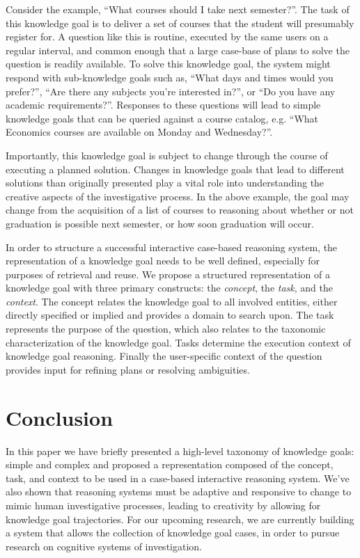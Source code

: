 \documentclass[11pt,letterpaper]{article}
\begin{document}
Consider the example, “What courses should I take next semester?”. The task of this knowledge goal is to deliver a set of courses that the student will presumably register for. A question like this is routine, executed by the same users on a regular interval, and common enough that a large case-base of plans to solve the question is readily available. To solve this knowledge goal, the system might respond with sub-knowledge goals such as, “What days and times would you prefer?”, “Are there any subjects you're interested in?”, or “Do you have any academic requirements?”. Responses to these questions will lead to simple knowledge goals that can be queried against a course catalog, e.g. “What Economics courses are available on Monday and Wednesday?”.

Importantly, this knowledge goal is subject to change through the course of executing a planned solution. Changes in knowledge goals that lead to different solutions than originally presented play a vital role into understanding the creative aspects of the investigative process. In the above example, the goal may change from the acquisition of a list of courses to reasoning about whether or not graduation is possible next semester, or how soon graduation will occur.

In order to structure a successful interactive case-based reasoning system, the representation of a knowledge goal needs to be well defined, especially for purposes of retrieval and reuse. We propose a structured representation of a knowledge goal with three primary constructs: the \textit{concept}, the \textit{task}, and the \textit{context}. The concept relates the knowledge goal to all involved entities, either directly specified or implied and provides a domain to search upon. The task represents the purpose of the question, which also relates to the taxonomic characterization of the knowledge goal. Tasks determine the execution context of knowledge goal reasoning. Finally the user-specific context of the question provides input for refining plans or resolving ambiguities.

\section{Conclusion}

In this paper we have briefly presented a high-level taxonomy of knowledge goals: simple and complex and proposed a representation composed of the concept, task, and context to be used in a case-based interactive reasoning system. We've also shown that reasoning systems must be adaptive and responsive to change to mimic human investigative processes, leading to creativity by allowing for knowledge goal trajectories. For our upcoming research, we are currently building a system that allows the collection of knowledge goal cases, in order to pursue research on cognitive systems of investigation.


\vspace{-0.25in}

{\parindent -10pt\leftskip 10pt\noindent



}

\end{document}
